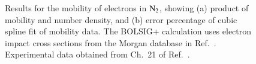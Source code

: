 \documentclass{warpdoc}
\let\citen\cite
\begin{document}
%
\begin{figure}
\centering
{}
\caption{Results for the mobility of electrons in ${\rm N_2}$, showing (a) product of mobility and number density, and (b) error percentage of cubic spline fit of  mobility data. The BOLSIG+ calculation uses electron impact cross sections from the Morgan database in Ref.\ \citen{jcp:2012:morgan}. Experimental data obtained from Ch.\ 21 of Ref.\ \citen{book:1997:grigoriev}.}
\label{fig:mobility_N2}
\end{figure}
\end{document}
